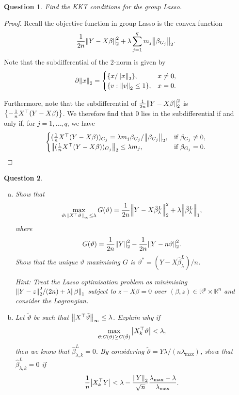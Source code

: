 \documentclass{article}
\theoremstyle{plain}
\newtheorem{question}{Question}
\theoremstyle{remark}
\renewcommand{\theta}{\vartheta}
\newcommand{\Bb}{\mathbb}
\newcommand{\Rm}{\mathrm}
\newcommand{\RR}{\Bb R}
\newcommand{\T}{^\top} %
\begin{document}
\begin{question}
	Find the KKT conditions for the group Lasso.
\end{question}

\begin{proof}
	Recall the objective function in group Lasso is the convex function
	\[
	\frac1{2n} \norm{Y- X\beta}_2^2 + \lambda \sum_{j=1}^q m_j \norm{\beta_{G_j}}_2. 
	\]
	Note that the subdifferential of the 2-norm is given by
	\[
	\partial \norm{x}_2 = \begin{cases}
		\qty{x/\norm{x}_2}, &x \neq 0, \\
		\qty{v : \norm{v}_2 \leq 1}, &x = 0. 
	\end{cases}
	\]
	
	Furthermore, note that the subdifferential of $\frac1{2n} \norm{Y - X\beta}_2^2$ is $\qty{-\frac1n X\T (Y - X\beta)}$. We therefore find that 0 lies in the subdifferential if and only if, for $j = 1, \dotsc, q$, we have
	\[
	\begin{cases}
		(\frac1n X\T (Y - X\beta))_{G_j} = \lambda m_j  \beta_{G_j} / \norm{\beta_{G_j}}_2, &\text{if $\beta_{G_j} \neq 0$}, \\
		\norm{(\frac1n X\T (Y - X\beta))_{G_j}}_2 \leq \lambda m_j, &\text{if $\beta_{G_j} = 0$}. 
	\end{cases}
	\]
\end{proof}

\begin{question}
	\begin{enumerate}[(a)]
		\item 	Show that
		\[
		\max_{\theta : \norm{X\T\theta}_\infty \leq \lambda} G(\theta) = \frac1{2n} \norm{Y - X\hat\beta_\lambda^L}_2^2 + \lambda \norm{\hat\beta_\lambda^L}_1, 
		\]
		where 
		\[
		G(\theta) = \frac1{2n} \norm{Y}_2^2 - \frac1{2n} \norm{Y - n\theta}_2^2. 
		\]
		Show that the unique $\theta$ maximising $G$ is $\theta^* = (Y - X\hat\beta_\lambda^L)/n$. 
		
		\emph{Hint:} Treat the Lasso optimisation problem as minimising $\norm{Y - z}^2_2/(2n) + \lambda\norm{\beta}_1$ subject to $z - X\beta = 0$ over $(\beta, z) \in \RR^p \times \RR^n$ and consider the Lagrangian. 
		
		\item Let $\tilde\theta$ be such that $\norm{X\T \tilde\theta}_\infty \leq \lambda$. Explain why if
		\[
		\max_{\theta: G(\theta) \geq G(\tilde\theta)} \abs{X_k\T\theta} < \lambda,
		\]
		then we know that $\hat\beta_{\lambda, k}^L = 0$. By considering $\tilde\theta = Y\lambda/(n\lambda_\Rm{max})$, show that $\hat\beta_{\lambda, k}^L = 0$ if
		\[
		\frac1n\abs{X_k\T Y} < \lambda - \frac{\norm{Y}_2}{\sqrt n} \frac{\lambda_\Rm{max} - \lambda}{\lambda_\Rm{max}}. 
		\]
	\end{enumerate}

\end{question}
\end{document}
